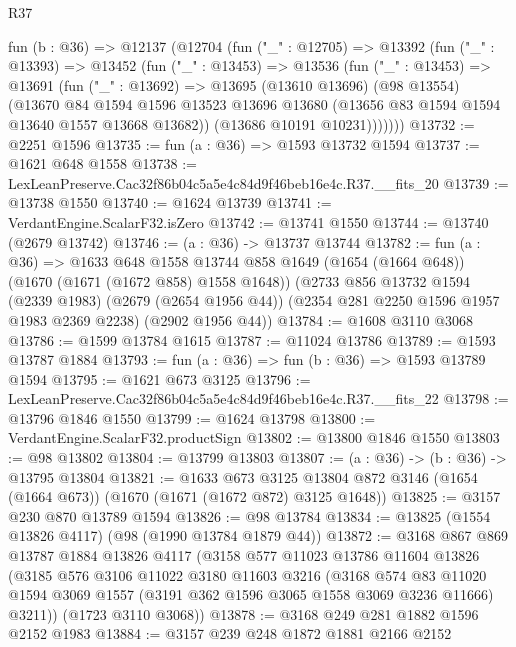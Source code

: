 \begin{lexlean}{R37}
\begin{coremodule}
  fun (b : @36) =>
  @12137
    (@12704
      (fun ("_" : @12705) =>
      @13392
        (fun ("_" : @13393) =>
        @13452
          (fun ("_" : @13453) =>
          @13536
            (fun ("_" : @13453) =>
            @13691
              (fun ("_" : @13692) =>
              @13695
                (@13610 @13696)
                (@98 @13554)
                (@13670
                  @84
                  @1594
                  @1596
                  @13523
                  @13696
                  @13680
                  (@13656 @83 @1594 @1594 @13640 @1557 @13668 @13682))
                (@13686 @10191 @10231)))))))
@13732 := @2251 @1596
@13735 := fun (a : @36) => @1593 @13732 @1594
@13737 := @1621 @648 @1558
@13738 := LexLeanPreserve.Cac32f86b04c5a5e4c84d9f46beb16e4c.R37.__fits_20
@13739 := @13738 @1550
@13740 := @1624 @13739
@13741 := VerdantEngine.ScalarF32.isZero
@13742 := @13741 @1550
@13744 := @13740 (@2679 @13742)
@13746 := (a : @36) -> @13737 @13744
@13782 := fun (a : @36) =>
  @1633
    @648
    @1558
    @13744
    @858
    @1649
    (@1654 (@1664 @648))
    (@1670 (@1671 (@1672 @858) @1558 @1648))
    (@2733
      @856
      @13732
      @1594
      (@2339 @1983)
      (@2679 (@2654 @1956 @44))
      (@2354 @281 @2250 @1596 @1957 @1983 @2369 @2238)
      (@2902 @1956 @44))
@13784 := @1608 @3110 @3068
@13786 := @1599 @13784 @1615
@13787 := @11024 @13786
@13789 := @1593 @13787 @1884
@13793 := fun (a : @36) => fun (b : @36) => @1593 @13789 @1594
@13795 := @1621 @673 @3125
@13796 := LexLeanPreserve.Cac32f86b04c5a5e4c84d9f46beb16e4c.R37.__fits_22
@13798 := @13796 @1846 @1550
@13799 := @1624 @13798
@13800 := VerdantEngine.ScalarF32.productSign
@13802 := @13800 @1846 @1550
@13803 := @98 @13802
@13804 := @13799 @13803
@13807 := (a : @36) -> (b : @36) -> @13795 @13804
@13821 := @1633
    @673
    @3125
    @13804
    @872
    @3146
    (@1654 (@1664 @673))
    (@1670 (@1671 (@1672 @872) @3125 @1648))
@13825 := @3157 @230 @870 @13789 @1594
@13826 := @98 @13784
@13834 := @13825 (@1554 @13826 @4117) (@98 (@1990 @13784 @1879 @44))
@13872 := @3168
    @867
    @869
    @13787
    @1884
    @13826
    @4117
    (@3158
      @577
      @11023
      @13786
      @11604
      @13826
      (@3185
        @576
        @3106
        @11022
        @3180
        @11603
        @3216
        (@3168
          @574
          @83
          @11020
          @1594
          @3069
          @1557
          (@3191 @362 @1596 @3065 @1558 @3069 @3236 @11666)
          @3211))
      (@1723 @3110 @3068))
@13878 := @3168 @249 @281 @1882 @1596 @2152 @1983
@13884 := @3157 @239 @248 @1872 @1881 @2166 @2152

\end{coremodule}
\end{lexlean}
